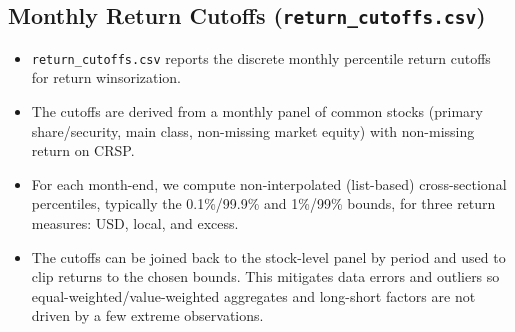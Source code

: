 \documentclass[12pt,title,fleqn]{article}
\begin{document}
\subsection{Monthly Return Cutoffs (\texttt{return\_cutoffs.csv})}
\begin{itemize}
    \item \texttt{return\_cutoffs.csv} reports the discrete monthly percentile return cutoffs for return winsorization.
    \item The cutoffs are derived from a monthly panel of common stocks (primary share/security, main class, non-missing market equity) with non-missing return on CRSP.
    \item For each month-end, we compute non-interpolated (list-based) cross-sectional percentiles, typically the 0.1\%/99.9\% and 1\%/99\% bounds, for three return measures: USD, local, and excess.
    \item The cutoffs can be joined back to the stock-level panel by period and used to clip returns to the chosen bounds. This mitigates data errors and outliers so equal-weighted/value-weighted aggregates and long-short factors are not driven by a few extreme observations.
\end{itemize}
\end{document}
